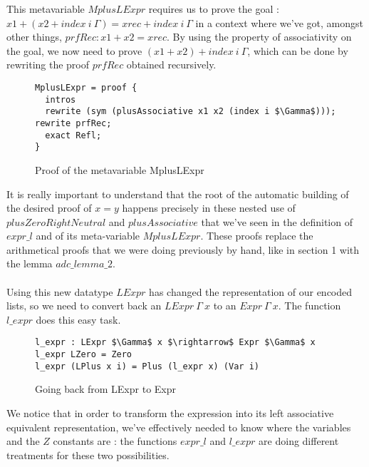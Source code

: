 This metavariable $MplusLExpr$ requires us to prove the goal : $x1 + (x2 + index\ i\ \Gamma) = xrec + index\ i\ \Gamma$ in a context where we've got, amongst other things, $prfRec : x1 + x2 = xrec$.
By using the property of associativity on the goal, we now need to prove $(x1 + x2) + index\ i\ \Gamma$, which can be done by rewriting the proof $prfRec$ obtained recursively.

\begin{figure}[H]
\figrule
\begin{center}
\begin{lstlisting}
MplusLExpr = proof {
  intros
  rewrite (sym (plusAssociative x1 x2 (index i $\Gamma$))); rewrite prfRec; 
  exact Refl;
}
\end{lstlisting}
\end{center}
\caption{Proof of the metavariable MplusLExpr}
\figrule
\end{figure}

It is really important to understand that the root of the automatic building of the desired proof of $x=y$ happens precisely in these nested use of $plusZeroRightNeutral$ and $plusAssociative$ that we've seen in the definition of $expr\_l$ and of its meta-variable $MplusLExpr$. These proofs replace the arithmetical proofs that we were doing previously by hand, like in section 1 with the lemma $adc\_lemma\_2$. \\
\\
Using this new datatype $LExpr$ has changed the representation of our encoded lists, so we need to convert back an $LExpr\ \Gamma\ x$ to an $Expr\ \Gamma\ x$. The function $l\_expr$ does this easy task.
\begin{figure}[H]
\figrule
\begin{center}
\begin{lstlisting}
l_expr : LExpr $\Gamma$ x $\rightarrow$ Expr $\Gamma$ x
l_expr LZero = Zero
l_expr (LPlus x i) = Plus (l_expr x) (Var i)
\end{lstlisting}
\end{center}
\caption{Going back from LExpr to Expr}
\figrule
\end{figure}


We notice that in order to transform the expression into its left associative equivalent representation, we've effectively needed to know where the variables and the $Z$ constants are : the functions $expr\_l$ and $l\_expr$ are doing different treatments for these two possibilities. \\
\\

